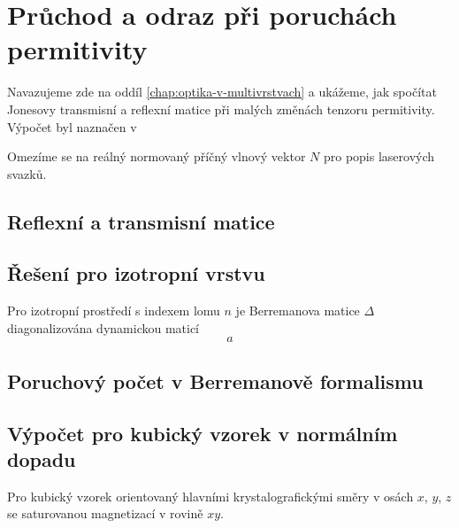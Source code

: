 \section{Průchod a odraz při poruchách permitivity}
\label{app:berreman}

Navazujeme zde na oddíl \ref{chap:optika-v-multivrstvach} a ukážeme, jak spočítat Jonesovy transmisní a reflexní matice při malých změnách tenzoru permitivity.
Výpočet byl naznačen v 

Omezíme se na reálný normovaný příčný vlnový vektor $N$ pro popis laserových svazků.

\subsection*{Reflexní a transmisní matice}

\subsection*{Řešení pro izotropní vrstvu}

Pro izotropní prostředí s indexem lomu $n$ je Berremanova matice $\Delta$ diagonalizována dynamickou maticí
\begin{equation}
\label{eqn:}
a
\end{equation}


\subsection*{Poruchový počet v Berremanově formalismu}

\subsection*{Výpočet pro kubický vzorek v normálním dopadu}

Pro kubický vzorek orientovaný hlavními krystalografickými směry v osách $x$, $y$, $z$ se saturovanou magnetizací v rovině $xy$.


